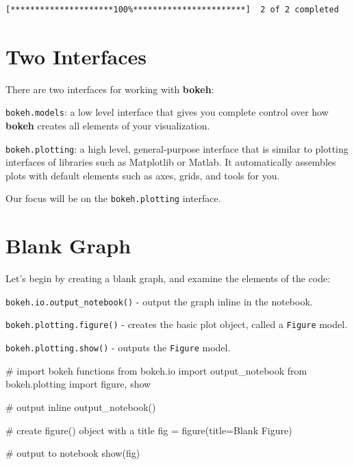 \documentclass[
  letterpaper,
  DIV=11,
  numbers=noendperiod]{scrreprt}
\newenvironment{Shaded}{\begin{snugshade}}{\end{snugshade}}
\newcommand{\CommentTok}[1]{\textcolor[rgb]{0.37,0.37,0.37}{#1}}
\newcommand{\ImportTok}[1]{\textcolor[rgb]{0.00,0.46,0.62}{#1}}
\newcommand{\NormalTok}[1]{\textcolor[rgb]{0.00,0.23,0.31}{#1}}
\newcommand{\OperatorTok}[1]{\textcolor[rgb]{0.37,0.37,0.37}{#1}}
\newcommand{\StringTok}[1]{\textcolor[rgb]{0.13,0.47,0.30}{#1}}
\begin{document}
\begin{verbatim}
[*********************100%***********************]  2 of 2 completed
\end{verbatim}

\hypertarget{two-interfaces}{%
\section{Two Interfaces}\label{two-interfaces}}

There are two interfaces for working with \textbf{bokeh}:

\texttt{bokeh.models}: a low level interface that gives you complete
control over how \textbf{bokeh} creates all elements of your
visualization.

\texttt{bokeh.plotting}: a high level, general-purpose interface that is
similar to plotting interfaces of libraries such as Matplotlib or
Matlab. It automatically assembles plots with default elements such as
axes, grids, and tools for you.

Our focus will be on the \texttt{bokeh.plotting} interface.

\hypertarget{blank-graph}{%
\section{Blank Graph}\label{blank-graph}}

Let's begin by creating a blank graph, and examine the elements of the
code:

\texttt{bokeh.io.output\_notebook()} - output the graph inline in the
notebook.

\texttt{bokeh.plotting.figure()} - creates the basic plot object, called
a \texttt{Figure} model.

\texttt{bokeh.plotting.show()} - outputs the \texttt{Figure} model.

\begin{Shaded}
\begin{Highlighting}[]
\CommentTok{\# import bokeh functions}
\ImportTok{from}\NormalTok{ bokeh.io }\ImportTok{import}\NormalTok{ output\_notebook}
\ImportTok{from}\NormalTok{ bokeh.plotting }\ImportTok{import}\NormalTok{ figure, show}

\CommentTok{\# output inline}
\NormalTok{output\_notebook()}

\CommentTok{\# create figure() object with a title}
\NormalTok{fig }\OperatorTok{=}\NormalTok{ figure(title}\OperatorTok{=}\StringTok{\textquotesingle{}Blank Figure\textquotesingle{}}\NormalTok{)}

\CommentTok{\# output to notebook}
\NormalTok{show(fig)}
\end{Highlighting}
\end{Shaded}
\end{document}
